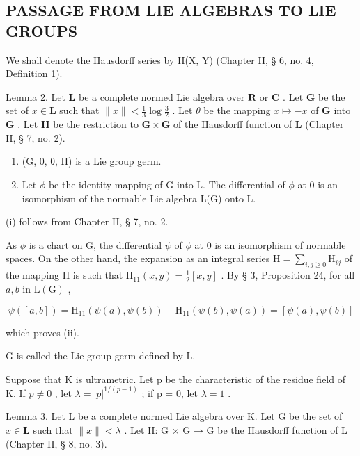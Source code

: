 \subsection{PASSAGE FROM LIE ALGEBRAS TO LIE GROUPS}

We shall denote the Hausdorff series by H(X, Y) (Chapter II, § 6, no. 4, Definition 1).

Lemma 2. Let \(\mathbf{L}\) be a complete normed Lie algebra over \(\mathbf{R}\) or \(\mathbf{C}\) . Let \(\mathbf{G}\) be the set of \(x \in \mathbf{L}\) such that \(\| x \| < \frac{1}{3} \log \frac{3}{2}\) . Let \(\theta\) be the mapping \(x \mapsto -x\) of \(\mathbf{G}\) into \(\mathbf{G}\) . Let \(\mathbf{H}\) be the restriction to \(\mathbf{G} \times \mathbf{G}\) of the Hausdorff function of \(\mathbf{L}\) (Chapter II, § 7, no. 2).

\begin{enumerate}
\def\labelenumi{(\roman{enumi})}
\item
  (G, 0, θ, H) is a Lie group germ.
\item
  Let \(\phi\) be the identity mapping of G into L. The differential of \(\phi\) at 0 is an isomorphism of the normable Lie algebra L(G) onto L.
\end{enumerate}
(i) follows from Chapter II, § 7, no. 2.

As \(\phi\) is a chart on G, the differential \(\psi\) of \(\phi\) at 0 is an isomorphism of normable spaces. On the other hand, the expansion as an integral series \(\mathrm{H} = \sum_{i,j\geqslant 0}\mathrm{H}_{ij}\) of the mapping H is such that \(\mathrm{H}_{11}(x,y) = \frac{1}{2} [x,y]\) . By § 3, Proposition 24, for all \(a,b\) in \(\mathrm{L}(\mathrm{G})\) ,

\[
\psi ([ a, b ]) = \mathrm{H} _ {1 1} (\psi (a), \psi (b)) - \mathrm{H} _ {1 1} (\psi (b), \psi (a)) = [ \psi (a), \psi (b) ]
\]

which proves (ii).

G is called the Lie group germ defined by L.

Suppose that K is ultrametric. Let p be the characteristic of the residue field of K. If \(p \neq 0\) , let \(\lambda = |p|^{1/(p-1)}\) ; if p = 0, let \(\lambda = 1\) .

Lemma 3. Let L be a complete normed Lie algebra over K. Let G be the set of \(x \in \mathbf{L}\) such that \(\| x \| < \lambda\) . Let H: G × G → G be the Hausdorff function of L (Chapter II, § 8, no. 3).

